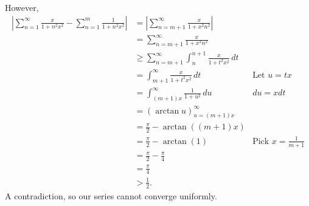 \documentclass{article}
\begin{document}
\begin{enumerate}
  However,
  \begin{align*}
      \left| \sum_{n=1}^{\infty} \frac{x}{1+n^2x^2}-\sum_{n=1}^{m} \frac{1}{1+n^2x^2} \right| &= \left| \sum_{n=m+1}^{\infty} \frac{x}{1+x^2n^2} \right|  \\
                  &=\sum_{n=m+1}^{\infty} \frac{x}{1+x^2n^2}\\
                  &\geq \sum_{n=m+1}^{\infty} \int_{n}^{n+1} \frac{x}{1+t^2x^2} \, d t \\
                    &= \int_{m+1}^{\infty} \frac{x}{1+t^2x^2} \, d t &\text{Let }u=tx \\
                    &= \int_{(m+1)x}^{\infty} \frac{1}{1+u^2} \, d u &du=xdt \\
                    &= \left( \arctan u \right)_{u=(m+1)x}^{\infty} \\
                    &= \frac{\pi}{2}-\arctan ((m+1)x)\\
                    &= \frac{\pi}{2}-\arctan(1) &\text{Pick }x=\frac{1}{m+1} \\
                    &= \frac{\pi}{2}-\frac{\pi}{4} \\
                    &= \frac{\pi}{4}\\
                    & >\frac{1}{2}
  .\end{align*}
A contradiction, so our series cannot converge uniformly.
\end{enumerate}
\end{document}

